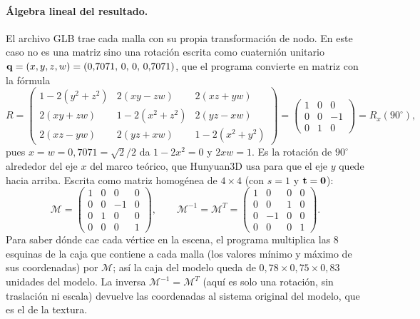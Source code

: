 \paragraph{Álgebra lineal del resultado.} El archivo GLB trae cada malla con su propia transformación de nodo. En este caso no es una matriz
sino una rotación escrita como cuaternión unitario $\mathbf{q}=(x,y,z,w)=(0{,}7071,\,0,\,0,\,0{,}7071)$, que el programa convierte en matriz con la fórmula
\begin{equation}
R=\begin{pmatrix}1-2(y^2+z^2)&2(xy-zw)&2(xz+yw)\\2(xy+zw)&1-2(x^2+z^2)&2(yz-xw)\\2(xz-yw)&2(yz+xw)&1-2(x^2+y^2)\end{pmatrix}
=\begin{pmatrix}1&0&0\\0&0&-1\\0&1&0\end{pmatrix}=R_x(90^\circ),
\end{equation}
pues $x=w=0{,}7071=\sqrt{2}/2$ da $1-2x^2=0$ y $2xw=1$. Es la rotación de $90^\circ$ alrededor del eje $x$ del marco teórico,
que Hunyuan3D usa para que el eje $y$ quede hacia arriba. Escrita como matriz homogénea de $4\times4$ (con $s=1$ y $\mathbf{t}=\mathbf{0}$):
\begin{equation}
\mathcal{M}=\begin{pmatrix} 1 & 0 & 0 & 0 \\ 0 & 0 & -1 & 0 \\ 0 & 1 & 0 & 0 \\ 0 & 0 & 0 & 1 \end{pmatrix},\qquad \mathcal{M}^{-1}=\mathcal{M}^{T}=\begin{pmatrix} 1 & 0 & 0 & 0 \\ 0 & 0 & 1 & 0 \\ 0 & -1 & 0 & 0 \\ 0 & 0 & 0 & 1 \end{pmatrix} .
\end{equation}
Para saber dónde cae cada vértice en la escena, el programa multiplica las $8$ esquinas de la caja que contiene a cada malla (los valores mínimo y máximo de sus
coordenadas) por $\mathcal{M}$; así la caja del modelo queda de $0{,}78 \times 0{,}75 \times 0{,}83$ unidades del modelo. La inversa $\mathcal{M}^{-1}=\mathcal{M}^{T}$ (aquí es solo
una rotación, sin traslación ni escala) devuelve las coordenadas al sistema original del modelo, que es el de la textura.
